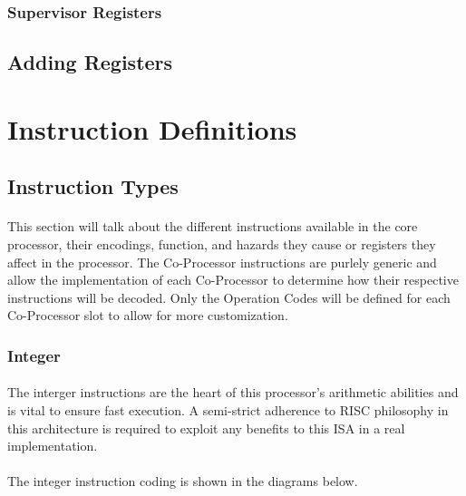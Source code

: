 \documentclass[letterpaper, 11pt]{article}
\begin{document}
\subsubsection{Supervisor Registers}
\subsection{Adding Registers}


\section{Instruction Definitions}
\subsection{Instruction Types}
\paragraph{}This section will talk about the different instructions available in the core processor, their encodings, function, and hazards
they cause or registers they affect in the processor. The Co-Processor instructions are purlely generic and allow the implementation of
each Co-Processor to determine how their respective instructions will be decoded. Only the Operation Codes will be defined for each 
Co-Processor slot to allow for more customization.
\subsubsection{Integer}
\paragraph{}The interger instructions are the heart of this processor's arithmetic abilities and is vital to ensure fast execution. A semi-strict
adherence to RISC philosophy in this architecture is required to exploit any benefits to this ISA in a real implementation.
\paragraph{}The integer instruction coding is shown in the diagrams below.
\end{document}
